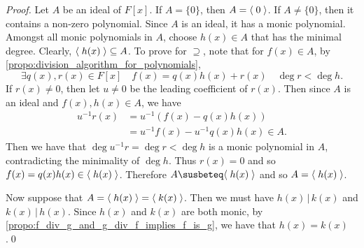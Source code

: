 \begin{proof}
  Let $A$ be an ideal of $F[x]$. If $A = \{0\}$, then $A = \langle \; 0 \; \rangle$. If $A \neq \{0\}$, then it contains a non-zero polynomial. Since $A$ is an ideal, it has a monic polynomial. Amongst all monic polynomials in $A$, choose $h(x) \in A$ that has the minimal degree. Clearly, $\langle \; h(x) \; \rangle \subseteq A$. To prove for $\supseteq$, note that for $f(x) \in A$, by \cref{propo:division_algorithm_for_polynomials},
  \begin{equation*}
    \exists q(x), r(x) \in F[x] \quad f(x) = q(x) h(x) + r(x) \quad \deg r < \deg h.
  \end{equation*}
  If $r(x) \neq 0$, then let $u \neq 0$ be the leading coefficient of $r(x)$. Then since $A$ is an ideal and $f(x), h(x) \in A$, we have
  \begin{align*}
    u^{-1} r(x) &= u^{-1}\left( f(x) - q(x) h(x) \right) \\
                &= u^{-1} f(x) - u^{-1} q(x) h(x) \in A.
  \end{align*}
  Then we have that $\deg u^{-1} r = \deg r < \deg h$ is a monic polynomial in $A$, contradicting the minimality of $\deg h$. Thus $r(x) = 0$ and so $f(x) = q(x) h(x) \in \langle \; h(x) \; \rangle$. Therefore $A \susbeteq \lra{h(x)}$ and so $A = \langle \; h(x) \; \rangle$.

  Now suppose that $A = \langle \; h(x) \; \rangle = \langle \; k(x) \; \rangle$. Then we must have $h(x) \, | \, k(x)$ and $k(x) \, | \, h(x)$. Since $h(x)$ and $k(x)$ are both monic, by \cref{propo:f_div_g_and_g_div_f_implies_f_is_g}, we have that $h(x) = k(x)$.\qed
\end{proof}



